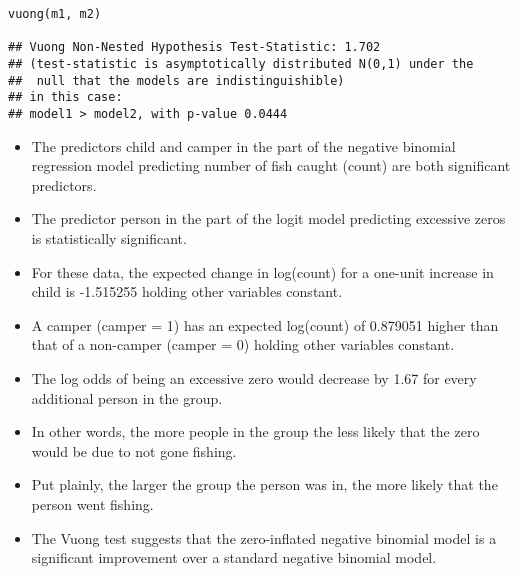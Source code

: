 \documentclass[MASTER.tex]{subfiles}
\begin{document}
\begin{frame}[fragile]
	\begin{verbatim}
vuong(m1, m2)
 
## Vuong Non-Nested Hypothesis Test-Statistic: 1.702 
## (test-statistic is asymptotically distributed N(0,1) under the
##  null that the models are indistinguishible)
## in this case:
## model1 > model2, with p-value 0.0444
\end{verbatim}
\end{frame}
\begin{frame}
\begin{itemize}
\item The predictors child and camper in the part of the negative binomial regression model predicting number of fish caught (count) are both significant predictors.
\item The predictor person in the part of the logit model predicting excessive zeros is statistically significant.
\item For these data, the expected change in log(count) for a one-unit increase in child is -1.515255 holding other variables constant. 
\item A camper (camper = 1) has an expected log(count) of 0.879051 higher than that of a non-camper (camper = 0) holding other variables constant.
\end{itemize}
\end{frame}
\begin{frame}
\begin{itemize}
\item The log odds of being an excessive zero would decrease by 1.67 for every additional person in the group. 
\item In other words, the more people in the group the less likely that the zero would be due to not gone fishing. 
\item Put plainly, the larger the group the person was in, the more likely that the person went fishing.
\item The Vuong test suggests that the zero-inflated negative binomial model is a significant improvement over a standard negative binomial model. 
\end{itemize}
\end{frame}
\end{document}
